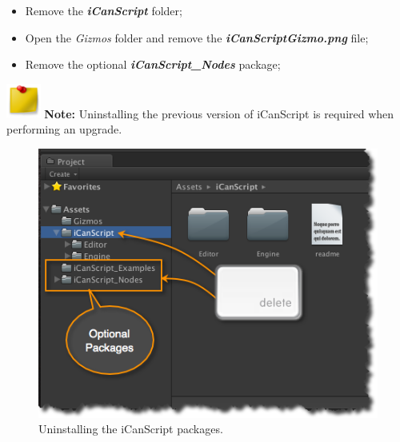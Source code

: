 \begin{itemize}
\item Remove the \emph{\textbf{iCanScript}} folder;

\item Open the \emph{Gizmos} folder and remove the \emph{\textbf{iCanScriptGizmo.png}} file;

\item Remove the optional \emph{\textbf{iCanScript\_Nodes}} package;

\end{itemize}
\begin{tipbox}

\includegraphics[width=32pt,height=32pt]{PostitNote_48x48.png} \textbf{Note:} Uninstalling the previous version of iCanScript is required when performing an upgrade.

\end{tipbox}



\begin{figure}[htbp]
\centering
\includegraphics[keepaspectratio,width=\textwidth,height=0.75\textheight]{remove-packages.png}
\caption{Uninstalling the iCanScript packages.}
\label{remove-packages.png}
\end{figure}

